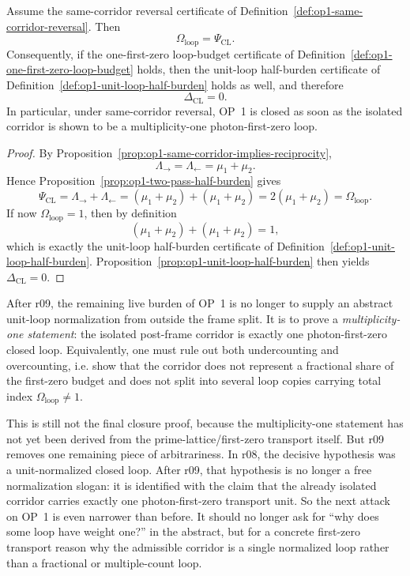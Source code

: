 \begin{proposition}
\label{prop:op1-one-first-zero-loop-budget}
Assume the same-corridor reversal certificate of Definition~\ref{def:op1-same-corridor-reversal}. Then
\[
  \Omega_{\mathrm{loop}} = \Psi_{\mathrm{CL}}.
\]
Consequently, if the one-first-zero loop-budget certificate of Definition~\ref{def:op1-one-first-zero-loop-budget} holds, then the unit-loop half-burden certificate of Definition~\ref{def:op1-unit-loop-half-burden} holds as well, and therefore
\[
  \Delta_{\mathrm{CL}} = 0.
\]
In particular, under same-corridor reversal, OP~1 is closed as soon as the isolated corridor is shown to be a multiplicity-one photon-first-zero loop.
\end{proposition}

\begin{proof}
By Proposition~\ref{prop:op1-same-corridor-implies-reciprocity},
\[
  \Lambda_{\rightarrow}=\Lambda_{\leftarrow}=\mu_1+\mu_2.
\]
Hence Proposition~\ref{prop:op1-two-pass-half-burden} gives
\[
  \Psi_{\mathrm{CL}} = \Lambda_{\rightarrow}+\Lambda_{\leftarrow}
  = (\mu_1+\mu_2)+(\mu_1+\mu_2)
  = 2(\mu_1+\mu_2)
  = \Omega_{\mathrm{loop}}.
\]
If now \(\Omega_{\mathrm{loop}}=1\), then by definition
\[
  (\mu_1+\mu_2)+(\mu_1+\mu_2)=1,
\]
which is exactly the unit-loop half-burden certificate of Definition~\ref{def:op1-unit-loop-half-burden}. Proposition~\ref{prop:op1-unit-loop-half-burden} then yields \(\Delta_{\mathrm{CL}}=0\).
\end{proof}

\begin{corollary}
\label{cor:op1-live-burden-after-r09}
After r09, the remaining live burden of OP~1 is no longer to supply an abstract unit-loop normalization from outside the frame split. It is to prove a \emph{multiplicity-one statement}: the isolated post-frame corridor is exactly one photon-first-zero closed loop. Equivalently, one must rule out both undercounting and overcounting, i.e. show that the corridor does not represent a fractional share of the first-zero budget and does not split into several loop copies carrying total index \(\Omega_{\mathrm{loop}}\neq 1\).
\end{corollary}

\begin{remark}
This is still not the final closure proof, because the multiplicity-one statement has not yet been derived from the prime-lattice/first-zero transport itself. But r09 removes one remaining piece of arbitrariness. In r08, the decisive hypothesis was a unit-normalized closed loop. After r09, that hypothesis is no longer a free normalization slogan: it is identified with the claim that the already isolated corridor carries exactly one photon-first-zero transport unit. So the next attack on OP~1 is even narrower than before. It should no longer ask for ``why does some loop have weight one?'' in the abstract, but for a concrete first-zero transport reason why the admissible corridor is a single normalized loop rather than a fractional or multiple-count loop.
\end{remark}



